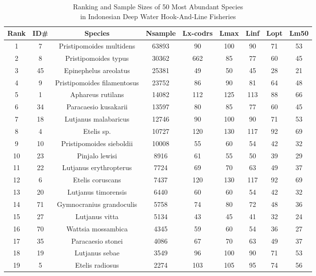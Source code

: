 \documentclass{report}\usepackage[]{graphicx}\usepackage[]{color}
\begin{document}
\clearpage
\newpage
\setlength{\tabcolsep}{5pt}
\captionsetup{width=1\textwidth, justification=centering}
\setlength{\LTpost}{0pt}
{\small
\begin{longtable}{ccccccccc}
\caption{Ranking and Sample Sizes of 50 Most Abundant Species \\in Indonesian Deep Water Hook-And-Line Fisheries} \\ 
  \hline
Rank & ID\# & Species & Nsample & Lx-codrs & Lmax & Linf & Lopt & Lm50 \\ 
  \hline
1 & 7 & Pristipomoides multidens & 63893 & 90 & 100 & 90 & 71 & 53 \\ 
  2 & 8 & Pristipomoides typus & 30362 & 662 & 85 & 77 & 60 & 45 \\ 
  3 & 45 & Epinephelus areolatus & 25381 & 49 & 50 & 45 & 28 & 21 \\ 
  4 & 9 & Pristipomoides filamentosus & 23752 & 86 & 90 & 81 & 64 & 48 \\ 
  5 & 1 & Aphareus rutilans & 14082 & 112 & 125 & 113 & 88 & 66 \\ 
  6 & 34 & Paracaesio kusakarii & 13597 & 80 & 85 & 77 & 60 & 45 \\ 
  7 & 18 & Lutjanus malabaricus & 12746 & 90 & 100 & 90 & 71 & 53 \\ 
  8 & 4 & Etelis sp. & 10727 & 120 & 130 & 117 & 92 & 69 \\ 
  9 & 10 & Pristipomoides sieboldii & 10008 & 55 & 60 & 54 & 42 & 32 \\ 
  10 & 23 & Pinjalo lewisi & 8916 & 61 & 55 & 50 & 39 & 29 \\ 
  11 & 22 & Lutjanus erythropterus & 7724 & 69 & 70 & 63 & 49 & 37 \\ 
  12 & 6 & Etelis coruscans & 7437 & 120 & 130 & 117 & 92 & 69 \\ 
  13 & 20 & Lutjanus timorensis & 6440 & 60 & 60 & 54 & 42 & 32 \\ 
  14 & 71 & Gymnocranius grandoculis & 5758 & 74 & 80 & 72 & 48 & 36 \\ 
  15 & 27 & Lutjanus vitta & 5134 & 43 & 45 & 41 & 32 & 24 \\ 
  16 & 70 & Wattsia mossambica & 4345 & 59 & 60 & 54 & 36 & 27 \\ 
  17 & 35 & Paracaesio stonei & 4086 & 67 & 70 & 63 & 49 & 37 \\ 
  18 & 19 & Lutjanus sebae & 3549 & 96 & 100 & 90 & 71 & 53 \\ 
  19 & 5 & Etelis radiosus & 2274 & 103 & 105 & 95 & 74 & 56 \\ 

\end{longtable}}
\end{document}
